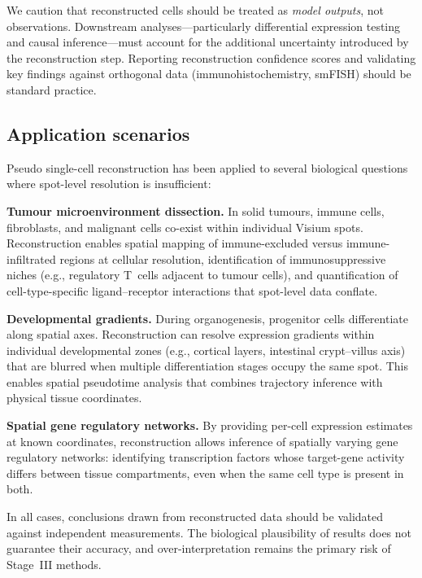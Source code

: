We caution that reconstructed cells should be treated as \emph{model outputs}, not observations. Downstream analyses---particularly differential expression testing and causal inference---must account for the additional uncertainty introduced by the reconstruction step. Reporting reconstruction confidence scores and validating key findings against orthogonal data (immunohistochemistry, smFISH) should be standard practice.

\subsection{Application scenarios}

Pseudo single-cell reconstruction has been applied to several biological questions where spot-level resolution is insufficient:

\textbf{Tumour microenvironment dissection.} In solid tumours, immune cells, fibroblasts, and malignant cells co-exist within individual Visium spots. Reconstruction enables spatial mapping of immune-excluded versus immune-infiltrated regions at cellular resolution, identification of immunosuppressive niches (e.g., regulatory T~cells adjacent to tumour cells), and quantification of cell-type-specific ligand--receptor interactions that spot-level data conflate.

\textbf{Developmental gradients.} During organogenesis, progenitor cells differentiate along spatial axes. Reconstruction can resolve expression gradients within individual developmental zones (e.g., cortical layers, intestinal crypt--villus axis) that are blurred when multiple differentiation stages occupy the same spot. This enables spatial pseudotime analysis that combines trajectory inference with physical tissue coordinates.

\textbf{Spatial gene regulatory networks.} By providing per-cell expression estimates at known coordinates, reconstruction allows inference of spatially varying gene regulatory networks: identifying transcription factors whose target-gene activity differs between tissue compartments, even when the same cell type is present in both.

In all cases, conclusions drawn from reconstructed data should be validated against independent measurements. The biological plausibility of results does not guarantee their accuracy, and over-interpretation remains the primary risk of Stage~III methods.

